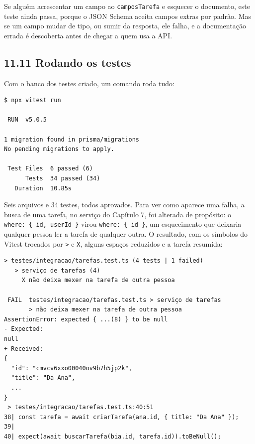 Se alguém acrescentar um campo ao \texttt{camposTarefa} e esquecer o documento, este teste ainda passa, porque o JSON Schema aceita campos extras por padrão. Mas se um campo mudar de tipo, ou sumir da resposta, ele falha, e a documentação errada é descoberta antes de chegar a quem usa a API.

\subsection{11.11 Rodando os testes}

Com o banco dos testes criado, um comando roda tudo:

\begin{codigo}
\begin{Verbatim}[breaklines=true, breaksymbolleft={}, fontsize=\footnotesize]
$ npx vitest run

 RUN  v5.0.5

1 migration found in prisma/migrations
No pending migrations to apply.

 Test Files  6 passed (6)
      Tests  34 passed (34)
   Duration  10.85s
\end{Verbatim}
\end{codigo}

Seis arquivos e 34 testes, todos aprovados. Para ver como aparece uma falha, a busca de uma tarefa, no serviço do Capítulo 7, foi alterada de propósito: o \texttt{where: \{ id, userId \}} virou \texttt{where: \{ id \}}, um esquecimento que deixaria qualquer pessoa ler a tarefa de qualquer outra. O resultado, com os símbolos do Vitest trocados por \texttt{>} e \texttt{X}, alguns espaços reduzidos e a tarefa resumida:

\begin{codigo}
\begin{Verbatim}[breaklines=true, breaksymbolleft={}, fontsize=\footnotesize]
 > testes/integracao/tarefas.test.ts (4 tests | 1 failed)
   > serviço de tarefas (4)
     X não deixa mexer na tarefa de outra pessoa

 FAIL  testes/integracao/tarefas.test.ts > serviço de tarefas
       > não deixa mexer na tarefa de outra pessoa
AssertionError: expected { ...(8) } to be null
- Expected:
null
+ Received:
{
  "id": "cmvcv6xxo00040ov9b7h5jp2k",
  "title": "Da Ana",
  ...
}
 > testes/integracao/tarefas.test.ts:40:51
38| const tarefa = await criarTarefa(ana.id, { title: "Da Ana" });
39|
40| expect(await buscarTarefa(bia.id, tarefa.id)).toBeNull();
\end{Verbatim}
\end{codigo}


